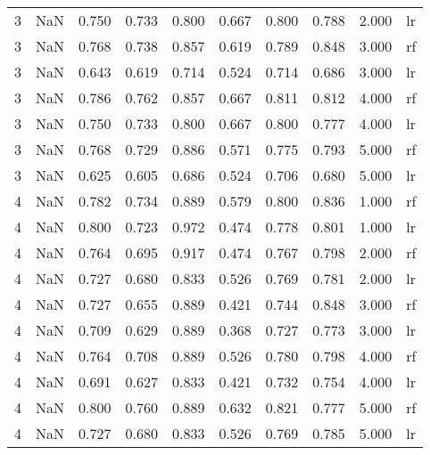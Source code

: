 \begin{tabular}{lrrrrrrrrl}
   3 &               NaN & 0.750 &  0.733 &        0.800 &        0.667 & 0.800 & 0.788 &        2.000 &    lr \\
   3 &               NaN & 0.768 &  0.738 &        0.857 &        0.619 & 0.789 & 0.848 &        3.000 &    rf \\
   3 &               NaN & 0.643 &  0.619 &        0.714 &        0.524 & 0.714 & 0.686 &        3.000 &    lr \\
   3 &               NaN & 0.786 &  0.762 &        0.857 &        0.667 & 0.811 & 0.812 &        4.000 &    rf \\
   3 &               NaN & 0.750 &  0.733 &        0.800 &        0.667 & 0.800 & 0.777 &        4.000 &    lr \\
   3 &               NaN & 0.768 &  0.729 &        0.886 &        0.571 & 0.775 & 0.793 &        5.000 &    rf \\
   3 &               NaN & 0.625 &  0.605 &        0.686 &        0.524 & 0.706 & 0.680 &        5.000 &    lr \\
   4 &               NaN & 0.782 &  0.734 &        0.889 &        0.579 & 0.800 & 0.836 &        1.000 &    rf \\
   4 &               NaN & 0.800 &  0.723 &        0.972 &        0.474 & 0.778 & 0.801 &        1.000 &    lr \\
   4 &               NaN & 0.764 &  0.695 &        0.917 &        0.474 & 0.767 & 0.798 &        2.000 &    rf \\
   4 &               NaN & 0.727 &  0.680 &        0.833 &        0.526 & 0.769 & 0.781 &        2.000 &    lr \\
   4 &               NaN & 0.727 &  0.655 &        0.889 &        0.421 & 0.744 & 0.848 &        3.000 &    rf \\
   4 &               NaN & 0.709 &  0.629 &        0.889 &        0.368 & 0.727 & 0.773 &        3.000 &    lr \\
   4 &               NaN & 0.764 &  0.708 &        0.889 &        0.526 & 0.780 & 0.798 &        4.000 &    rf \\
   4 &               NaN & 0.691 &  0.627 &        0.833 &        0.421 & 0.732 & 0.754 &        4.000 &    lr \\
   4 &               NaN & 0.800 &  0.760 &        0.889 &        0.632 & 0.821 & 0.777 &        5.000 &    rf \\
   4 &               NaN & 0.727 &  0.680 &        0.833 &        0.526 & 0.769 & 0.785 &        5.000 &    lr \\
\bottomrule
\end{tabular}
